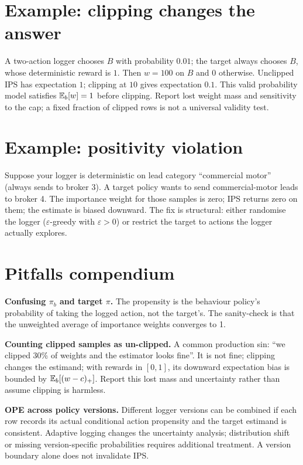 \documentclass[11pt,oneside]{scrbook}
\begin{document}
\section{Example: clipping changes the answer}
A two-action logger chooses $B$ with probability $0.01$; the target
always chooses $B$, whose deterministic reward is $1$. Then $w=100$
on $B$ and $0$ otherwise. Unclipped IPS has expectation $1$; clipping
at $10$ gives expectation $0.1$. This valid probability model satisfies
$\mathbb{E}_b[w]=1$ before clipping. Report lost weight mass and sensitivity to
the cap; a fixed fraction of clipped rows is not a universal validity test.

\section{Example: positivity violation}

Suppose your logger is deterministic on lead category ``commercial motor''
(always sends to broker 3). A target policy wants to send commercial-motor
leads to broker 4. The importance weight for those samples is zero;
IPS returns zero on them; the estimate is biased downward. The fix is
structural: either randomise the logger ($\varepsilon$-greedy with
$\varepsilon > 0$) or restrict the target to actions the logger
actually explores.

\section{Pitfalls compendium}

\begin{pitfall}
\textbf{Confusing $\pi_b$ and target $\pi$.} The propensity is the
behaviour policy's probability of taking the logged action, not the
target's. The sanity-check is that the unweighted average of importance
weights converges to 1.
\end{pitfall}

\begin{pitfall}
\textbf{Counting clipped samples as un-clipped.} A common production
sin: ``we clipped 30\% of weights and the estimator looks fine''. It
is not fine; clipping changes the estimand; with rewards in $[0,1]$, its downward
expectation bias is bounded by $\mathbb{E}_b[(w-c)_+]$. Report this lost mass
and uncertainty rather than assume clipping is harmless.
\end{pitfall}

\begin{pitfall}
\textbf{OPE across policy versions.} Different logger versions can be
combined if each row records its actual conditional action propensity and
the target estimand is consistent. Adaptive logging changes the uncertainty
analysis; distribution shift or missing version-specific probabilities
requires additional treatment. A version boundary alone does not invalidate IPS.

\end{pitfall}
\end{document}
